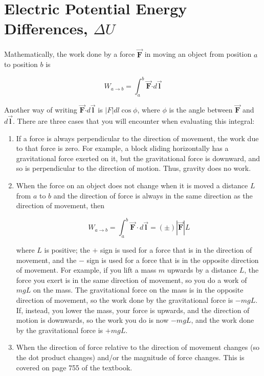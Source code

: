 \documentclass{article}
\newcommand{\bfvec}[1]{\vec{\mathbf{#1}}}
\newcommand{\bfcdot}[0]{\boldsymbol{\cdot}}
\begin{document}
\section{Electric Potential Energy Differences, $\Delta U$}


Mathematically, the work done by a force $\bfvec{F}$ in moving an object from position $a$ to position $b$ is

$$
W_{a\rightarrow b}=\int_a^b \bfvec{F}\bfcdot d\bfvec{l}
$$

Another way of writing $\bfvec{F}\bfcdot d\bfvec{l}$ is $|F|dl\cos\phi$, where $\phi$ is the angle between $\bfvec{F}$ and $d{\bfvec l}$. There are three cases that you will encounter when evaluating this integral:

\begin{enumerate}

  \item If a force is always perpendicular to the direction of movement, the work due to that force is zero. For example, a block sliding horizontally has a gravitational force exerted on it, but the gravitational force is downward, and so is perpendicular to the direction of motion. Thus, gravity does no work.

  \item When the force on an object does not change when it is moved a distance $L$ from $a$ to $b$ and the direction of force is always in the same direction as the direction of movement, then

        $$W_{a\rightarrow b}=\int_a^b \bfvec{F}\cdot d\bfvec{l}=(\pm)|\bfvec{F}|L$$

        where $L$ is positive; the $+$ sign is used for a force that is in the direction of movement, and the $-$ sign is used for a force that is in the opposite direction of movement. For example, if you lift a mass $m$ upwards by a distance $L$, the force you exert is in the same direction of movement, so you do a work of $mgL$ on the mass. The gravitational force on the mass is in the opposite direction of movement, so the work done by the gravitational force is $-mgL$. If, instead, you lower the mass, your force is upwards, and the direction of motion is downwards, so the work you do is now $-mgL$, and the work done by the gravitational force is $+mgL$.

  \item When the direction of force relative to the direction of movement changes (so the dot product changes) and/or the magnitude of force changes. This is covered on page 755 of the textbook.

\end{enumerate}
\end{document}
